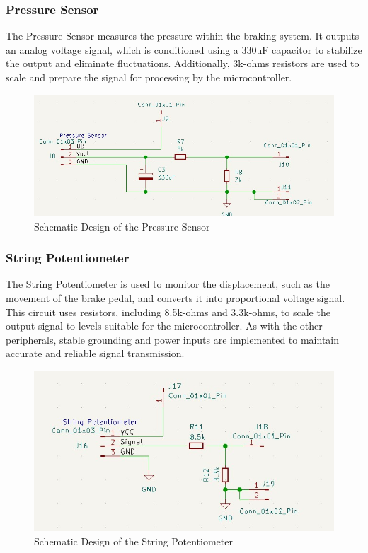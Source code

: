 \documentclass[12pt]{article}
\begin{document}
\subsubsection*{Pressure Sensor}
The Pressure Sensor measures the pressure within the braking system. It outputs
an analog voltage signal, which is conditioned using a 330uF capacitor to
stabilize the output and eliminate fluctuations. Additionally, 3k-ohms
resistors are used to scale and prepare the signal for processing by the
microcontroller.

\begin{figure}[H]
  \includegraphics[width=\textwidth]{../assets/pcb/image4.jpg}
  \caption{Schematic Design of the Pressure Sensor}
\end{figure}

\subsubsection*{String Potentiometer}
The String Potentiometer is used to monitor the displacement, such as the
movement of the brake pedal, and converts it into proportional voltage signal.
This circuit uses resistors, including 8.5k-ohms and 3.3k-ohms, to scale the
output signal to levels suitable for the microcontroller. As with the other
peripherals, stable grounding and power inputs are implemented to maintain
accurate and reliable signal transmission.

\begin{figure}[H]
  \includegraphics[width=\textwidth]{../assets/pcb/image5.jpg}
  \caption{Schematic Design of the String Potentiometer}
\end{figure}
\end{document}

